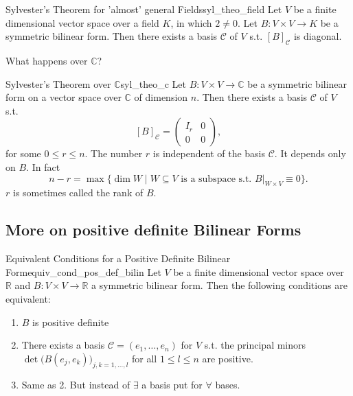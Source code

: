 \begin{theorem}{Sylvester's Theorem for 'almost' general Fields}{syl_theo_field}
	Let $V$ be a finite dimensional vector space over a field $K$, in which $2 \neq 0$. Let $B:V \times V \to K$ be a symmetric bilinear form. Then there exists a basis $\mathcal{C}$ of $V$ s.t. $[B]_{\mathcal{C}}$ is diagonal.
\end{theorem}

What happens over $\mathbb{C}$?

\begin{theorem}{Sylvester's Theorem over $\mathbb{C}$}{syl_theo_c}
	Let $B:V \times V \to \mathbb{C}$ be a symmetric bilinear form on a vector space over $\mathbb{C}$ of dimension $n$. Then there exists a basis $\mathcal{C}$ of $V$ s.t.
	\[
		[B]_{\mathcal{C}} = 
		\begin{pmatrix}
			I_r & 0\\
			0 & 0
		\end{pmatrix},
	\]
	for some $0 \leq r \leq n$. The number $r$ is independent of the basis $\mathcal{C}$. It depends only on $B$. In fact
	\[
		n-r = \max\{\dim W \;|\; W \subseteq V \text{ is a subspace s.t. } B|_{W \times V} \equiv 0\}.
	\]
	$r$ is sometimes called the rank of $B$.
\end{theorem}

\subsection{More on positive definite Bilinear Forms}

\begin{theorem}{Equivalent Conditions for a Positive Definite Bilinear Form}{equiv_cond_pos_def_bilin}
	Let $V$ be a finite dimensional vector space over $\mathbb{R}$ and $B: V \times V \to \mathbb{R}$ a symmetric bilinear form. Then the following conditions are equivalent:
	\begin{enumerate}
		\item $B$ is positive definite
		\item There exists a basis $\mathcal{C} = (e_1, \hdots , e_n)$ for $V$ s.t. the principal minors $\det\big(B(e_j, e_k)\big)_{j,k = 1, \hdots , l}$ for all $1 \leq l \leq n$ are positive.
		\item Same as 2. But instead of $\exists$ a basis put for $\forall$ bases.
	\end{enumerate}
\end{theorem}





